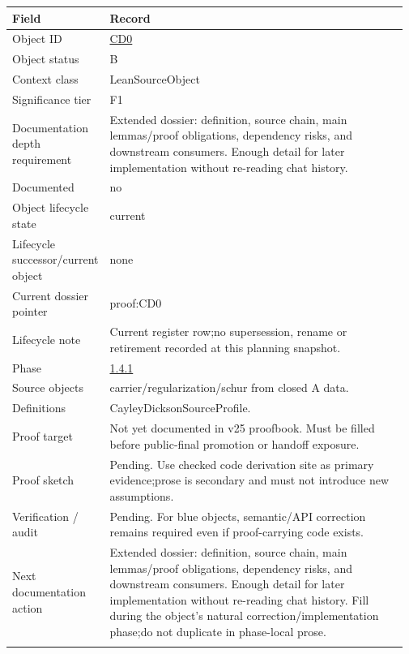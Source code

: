 \begin{longtable}{L{0.16\linewidth} L{0.81\linewidth}}
\hline
\textbf{Field} & \textbf{Record}\\
\hline
Object ID & \hyperlink{object-row-CD0}{CD0}\\
\hline\addlinespace[0.20em]
Object status & B\\
\hline\addlinespace[0.20em]
Context class & LeanSourceObject\\
\hline\addlinespace[0.20em]
Significance tier & F1\\
\hline\addlinespace[0.20em]
Documentation depth requirement & Extended dossier: definition, source chain, main lemmas/\allowbreak{}proof obligations, dependency risks, and downstream consumers. Enough detail for later implementation without re-reading chat history.\\
\hline\addlinespace[0.20em]
Documented & no\\
\hline\addlinespace[0.20em]
Object lifecycle state & current\\
\hline\addlinespace[0.20em]
Lifecycle successor/\allowbreak{}current object & none\\
\hline\addlinespace[0.20em]
Current dossier pointer & proof:CD0\\
\hline\addlinespace[0.20em]
Lifecycle note & Current register row;\newline no supersession, rename or retirement recorded at this planning snapshot.\\
\hline\addlinespace[0.20em]
Phase & \hyperlink{phase-row-1-4-1}{1.4.1}\\
\hline\addlinespace[0.20em]
Source objects & carrier/\allowbreak{}regularization/\allowbreak{}schur from closed A data.\\
\hline\addlinespace[0.20em]
Definitions & CayleyDicksonSourceProfile.\\
\hline\addlinespace[0.20em]
Proof target & Not yet documented in v25 proofbook. Must be filled before public-final promotion or handoff exposure.\\
\hline\addlinespace[0.20em]
Proof sketch & Pending. Use checked code derivation site as primary evidence;\newline prose is secondary and must not introduce new assumptions.\\
\hline\addlinespace[0.20em]
Verification /\allowbreak{} audit & Pending. For blue objects, semantic/\allowbreak{}API correction remains required even if proof-carrying code exists.\\
\hline\addlinespace[0.20em]
Next documentation action & Extended dossier: definition, source chain, main lemmas/\allowbreak{}proof obligations, dependency risks, and downstream consumers. Enough detail for later implementation without re-reading chat history. Fill during the object's natural correction/\allowbreak{}implementation phase;\newline do not duplicate in phase-local prose.\\
\hline\addlinespace[0.20em]
\end{longtable}
